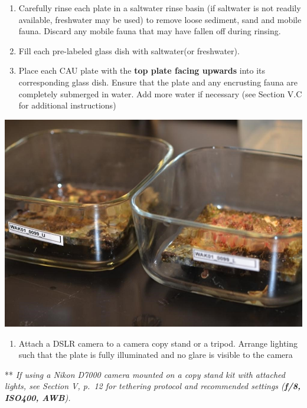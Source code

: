 \documentclass[]{book}
\providecommand{\tightlist}{%
  \setlength{\itemsep}{0pt}\setlength{\parskip}{0pt}}
\begin{document}
\begin{enumerate}
\def\labelenumi{\arabic{enumi}.}
\setcounter{enumi}{2}
\item
  Carefully rinse each plate in a saltwater rinse basin (if saltwater is not readily available, freshwater may be used) to remove loose sediment, sand and mobile fauna. Discard any mobile fauna that may have fallen off during rinsing.
\item
  Fill each pre-labeled glass dish with saltwater(or freshwater).
\item
  Place each CAU plate with the \textbf{top plate facing upwards} into its corresponding glass dish. Ensure that the plate and any encrusting fauna are completely submerged in water. Add more water if necessary (see Section V.C for additional instructions)
\end{enumerate}

\includegraphics{images/CAU_dried.jpg}

\begin{enumerate}
\def\labelenumi{\arabic{enumi}.}
\setcounter{enumi}{5}
\tightlist
\item
  Attach a DSLR camera to a camera copy stand or a tripod. Arrange lighting such that the plate is fully illuminated and no glare is visible to the camera
\end{enumerate}

** \emph{If using a Nikon D7000 camera mounted on a copy stand kit with attached lights, see Section V, p.~12 for tethering protocol and recommended settings (\textbf{f/8, ISO400, AWB}).}
\end{document}
